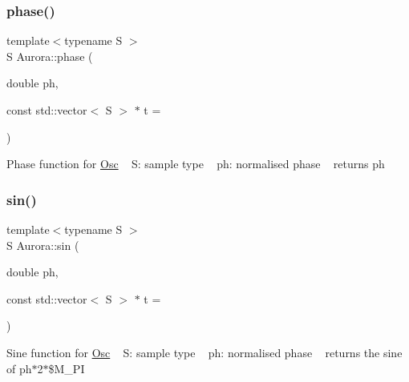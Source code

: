 \mbox{\label{namespace_aurora_a6a6af5d9695d0ec8fcb343c456c1faab}} 
\subsubsection{\texorpdfstring{phase()}{phase()}}
{\footnotesize\ttfamily template$<$typename S $>$ \\
S Aurora\+::phase (\begin{DoxyParamCaption}\item[{double}]{ph,  }\item[{const std\+::vector$<$ S $>$ $\ast$}]{t = {} }\end{DoxyParamCaption})\hspace{0.3cm}{\ttfamily [inline]}}

Phase function for \hyperlink{class_aurora_1_1_osc}{Osc} ~\newline
S\+: sample type ~\newline
ph\+: normalised phase ~\newline
returns ph \mbox{\label{namespace_aurora_a76909b8c5d5801213d35fffa69499885}} 
\subsubsection{\texorpdfstring{sin()}{sin()}}
{\footnotesize\ttfamily template$<$typename S $>$ \\
S Aurora\+::sin (\begin{DoxyParamCaption}\item[{double}]{ph,  }\item[{const std\+::vector$<$ S $>$ $\ast$}]{t = {} }\end{DoxyParamCaption})\hspace{0.3cm}{\ttfamily [inline]}}

Sine function for \hyperlink{class_aurora_1_1_osc}{Osc} ~\newline
S\+: sample type ~\newline
ph\+: normalised phase ~\newline
returns the sine of ph$\ast$2$\ast$\$\+M\+\_\+\+PI \mbox{\label{namespace_aurora_addae9c1b83fcfd6ee11bbbe5a4d3d329}} 
